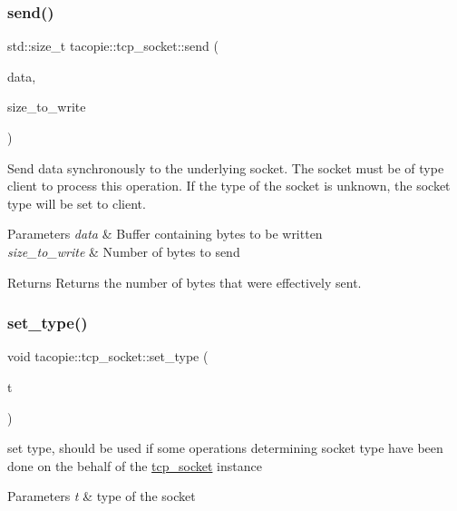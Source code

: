 \subsubsection{\texorpdfstring{send()}{send()}}
{\footnotesize\ttfamily std\+::size\+\_\+t tacopie\+::tcp\+\_\+socket\+::send (\begin{DoxyParamCaption}\item[{const std\+::vector$<$ char $>$ \&}]{data,  }\item[{std\+::size\+\_\+t}]{size\+\_\+to\+\_\+write }\end{DoxyParamCaption})}

Send data synchronously to the underlying socket. The socket must be of type client to process this operation. If the type of the socket is unknown, the socket type will be set to client.


\begin{DoxyParams}{Parameters}
{\em data} & Buffer containing bytes to be written \\
\hline
{\em size\+\_\+to\+\_\+write} & Number of bytes to send \\
\hline
\end{DoxyParams}
\begin{DoxyReturn}{Returns}
Returns the number of bytes that were effectively sent. 
\end{DoxyReturn}
\mbox{\label{classtacopie_1_1tcp__socket_a89be86ab254eec3fc16eedfba8b16fb2}} 
\subsubsection{\texorpdfstring{set\+\_\+type()}{set\_type()}}
{\footnotesize\ttfamily void tacopie\+::tcp\+\_\+socket\+::set\+\_\+type (\begin{DoxyParamCaption}\item[{\hyperlink{classtacopie_1_1tcp__socket_ad8376e85df96ab9523f5d079ed7172ab}{type}}]{t }\end{DoxyParamCaption})}

set type, should be used if some operations determining socket type have been done on the behalf of the \hyperlink{classtacopie_1_1tcp__socket}{tcp\+\_\+socket} instance


\begin{DoxyParams}{Parameters}
{\em t} & type of the socket \\
\hline
\end{DoxyParams}


